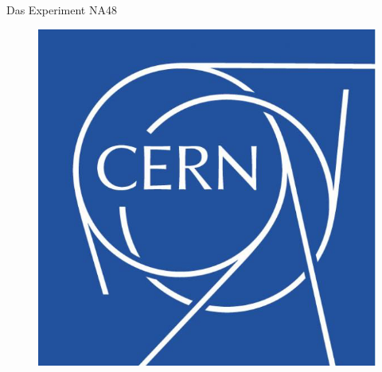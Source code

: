 \documentclass[aspectratio=1610, professionalfonts, 9pt, t]{beamer}
\begin{document}
  \begin{frame}{Das Experiment NA48}
    \begin{figure}
      \includegraphics[height=0.8\textheight]{Images/ripcern.png}
    \end{figure}
  \end{frame}

\end{document}
